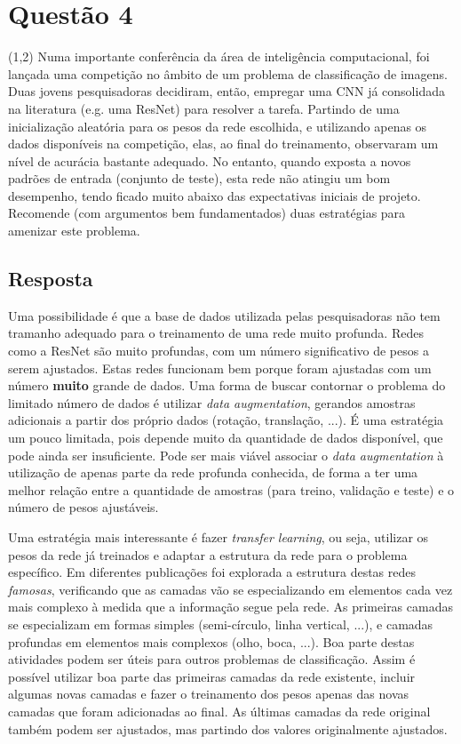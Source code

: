 \documentclass[final,3p]{elsarticle}
\numberwithin{equation}{section}
\begin{document}
\section{Questão 4}

    (1,2) Numa importante conferência da área de inteligência computacional, foi lançada uma competição no âmbito de um problema de classificação de imagens. Duas jovens pesquisadoras decidiram, então, empregar uma CNN já consolidada na literatura (e.g. uma ResNet) para resolver a tarefa. Partindo de uma inicialização aleatória para os pesos da rede escolhida, e utilizando apenas os dados disponíveis na competição, elas, ao final do treinamento, observaram um nível de acurácia bastante adequado. No entanto, quando exposta a novos padrões de entrada (conjunto de teste), esta rede não atingiu um bom desempenho, tendo ficado muito abaixo das expectativas iniciais de projeto. Recomende (com argumentos bem fundamentados) duas estratégias para amenizar este problema.

    \subsection{Resposta}

        Uma possibilidade é que a base de dados utilizada pelas pesquisadoras não tem tramanho adequado para o treinamento de uma rede muito profunda. Redes como a ResNet são muito profundas, com um número significativo de pesos a serem ajustados. Estas redes funcionam bem porque foram ajustadas com um número \textbf{muito} grande de dados. Uma forma de buscar contornar o problema do limitado número de dados é utilizar \emph{data augmentation}, gerandos amostras adicionais a partir dos próprio dados (rotação, translação, ...). É uma estratégia um pouco limitada, pois depende muito da quantidade de dados disponível, que pode ainda ser insuficiente. Pode ser mais viável associar o \emph{data augmentation} à utilização de apenas parte da rede profunda conhecida, de forma a ter uma melhor relação entre a quantidade de amostras (para treino, validação e teste) e o número de pesos ajustáveis.

        Uma estratégia mais interessante é fazer \emph{transfer learning}, ou seja, utilizar os pesos da rede já treinados e adaptar a estrutura da rede para o problema específico. Em diferentes publicações foi explorada a estrutura destas redes \emph{famosas}, verificando que as camadas vão se especializando em elementos cada vez mais complexo à medida que a informação segue pela rede. As primeiras camadas se especializam em formas simples (semi-círculo, linha vertical, ...), e camadas profundas em elementos mais complexos (olho, boca, ...). Boa parte destas atividades podem ser úteis para outros problemas de classificação. Assim é possível utilizar boa parte das primeiras camadas da rede existente, incluir algumas novas camadas e fazer o treinamento dos pesos apenas das novas camadas que foram adicionadas ao final. As últimas camadas da rede original também podem ser ajustados, mas partindo dos valores originalmente ajustados.
\end{document}
